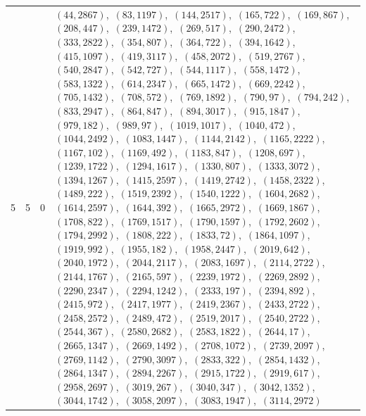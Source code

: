 \documentclass[11pt]{article}
\begin{document}
\begin{longtable}{@{}rrl>{\raggedright\arraybackslash}p{}@{}}
5 & 5 & $0$ & $(44,2867)$,\allowbreak\ $(83,1197)$,\allowbreak\ $(144,2517)$,\allowbreak\ $(165,722)$,\allowbreak\ $(169,867)$,\allowbreak\ $(208,447)$,\allowbreak\ $(239,1472)$,\allowbreak\ $(269,517)$,\allowbreak\ $(290,2472)$,\allowbreak\ $(333,2822)$,\allowbreak\ $(354,807)$,\allowbreak\ $(364,722)$,\allowbreak\ $(394,1642)$,\allowbreak\ $(415,1097)$,\allowbreak\ $(419,3117)$,\allowbreak\ $(458,2072)$,\allowbreak\ $(519,2767)$,\allowbreak\ $(540,2847)$,\allowbreak\ $(542,727)$,\allowbreak\ $(544,1117)$,\allowbreak\ $(558,1472)$,\allowbreak\ $(583,1322)$,\allowbreak\ $(614,2347)$,\allowbreak\ $(665,1472)$,\allowbreak\ $(669,2242)$,\allowbreak\ $(705,1432)$,\allowbreak\ $(708,572)$,\allowbreak\ $(769,1892)$,\allowbreak\ $(790,97)$,\allowbreak\ $(794,242)$,\allowbreak\ $(833,2947)$,\allowbreak\ $(864,847)$,\allowbreak\ $(894,3017)$,\allowbreak\ $(915,1847)$,\allowbreak\ $(979,182)$,\allowbreak\ $(989,97)$,\allowbreak\ $(1019,1017)$,\allowbreak\ $(1040,472)$,\allowbreak\ $(1044,2492)$,\allowbreak\ $(1083,1447)$,\allowbreak\ $(1144,2142)$,\allowbreak\ $(1165,2222)$,\allowbreak\ $(1167,102)$,\allowbreak\ $(1169,492)$,\allowbreak\ $(1183,847)$,\allowbreak\ $(1208,697)$,\allowbreak\ $(1239,1722)$,\allowbreak\ $(1294,1617)$,\allowbreak\ $(1330,807)$,\allowbreak\ $(1333,3072)$,\allowbreak\ $(1394,1267)$,\allowbreak\ $(1415,2597)$,\allowbreak\ $(1419,2742)$,\allowbreak\ $(1458,2322)$,\allowbreak\ $(1489,222)$,\allowbreak\ $(1519,2392)$,\allowbreak\ $(1540,1222)$,\allowbreak\ $(1604,2682)$,\allowbreak\ $(1614,2597)$,\allowbreak\ $(1644,392)$,\allowbreak\ $(1665,2972)$,\allowbreak\ $(1669,1867)$,\allowbreak\ $(1708,822)$,\allowbreak\ $(1769,1517)$,\allowbreak\ $(1790,1597)$,\allowbreak\ $(1792,2602)$,\allowbreak\ $(1794,2992)$,\allowbreak\ $(1808,222)$,\allowbreak\ $(1833,72)$,\allowbreak\ $(1864,1097)$,\allowbreak\ $(1919,992)$,\allowbreak\ $(1955,182)$,\allowbreak\ $(1958,2447)$,\allowbreak\ $(2019,642)$,\allowbreak\ $(2040,1972)$,\allowbreak\ $(2044,2117)$,\allowbreak\ $(2083,1697)$,\allowbreak\ $(2114,2722)$,\allowbreak\ $(2144,1767)$,\allowbreak\ $(2165,597)$,\allowbreak\ $(2239,1972)$,\allowbreak\ $(2269,2892)$,\allowbreak\ $(2290,2347)$,\allowbreak\ $(2294,1242)$,\allowbreak\ $(2333,197)$,\allowbreak\ $(2394,892)$,\allowbreak\ $(2415,972)$,\allowbreak\ $(2417,1977)$,\allowbreak\ $(2419,2367)$,\allowbreak\ $(2433,2722)$,\allowbreak\ $(2458,2572)$,\allowbreak\ $(2489,472)$,\allowbreak\ $(2519,2017)$,\allowbreak\ $(2540,2722)$,\allowbreak\ $(2544,367)$,\allowbreak\ $(2580,2682)$,\allowbreak\ $(2583,1822)$,\allowbreak\ $(2644,17)$,\allowbreak\ $(2665,1347)$,\allowbreak\ $(2669,1492)$,\allowbreak\ $(2708,1072)$,\allowbreak\ $(2739,2097)$,\allowbreak\ $(2769,1142)$,\allowbreak\ $(2790,3097)$,\allowbreak\ $(2833,322)$,\allowbreak\ $(2854,1432)$,\allowbreak\ $(2864,1347)$,\allowbreak\ $(2894,2267)$,\allowbreak\ $(2915,1722)$,\allowbreak\ $(2919,617)$,\allowbreak\ $(2958,2697)$,\allowbreak\ $(3019,267)$,\allowbreak\ $(3040,347)$,\allowbreak\ $(3042,1352)$,\allowbreak\ $(3044,1742)$,\allowbreak\ $(3058,2097)$,\allowbreak\ $(3083,1947)$,\allowbreak\ $(3114,2972)$\\

\end{longtable}
\end{document}
